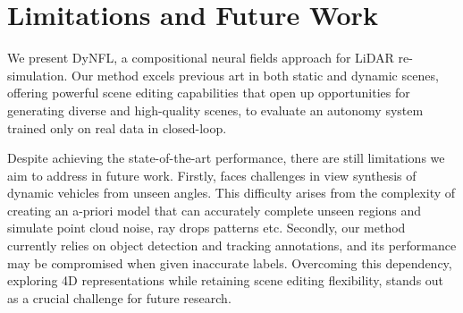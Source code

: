 \section{Limitations and Future Work}
We present DyNFL, a compositional neural fields approach for LiDAR re-simulation. Our method excels previous art in both static and dynamic scenes, offering powerful scene editing capabilities that open up opportunities for generating diverse and high-quality scenes, to evaluate an autonomy system trained only on real data in closed-loop.

Despite achieving the state-of-the-art performance, there are still limitations we aim to address in future work. Firstly, \dynfl faces challenges in view synthesis of dynamic vehicles from unseen angles. This difficulty arises from the complexity of creating an a-priori model that can accurately complete unseen regions and simulate point cloud noise, ray drops patterns etc. Secondly, our method currently relies on object detection and tracking annotations, and its performance may be compromised when given inaccurate labels. Overcoming this dependency, exploring 4D representations while retaining scene editing flexibility, stands out as a crucial challenge for future research.